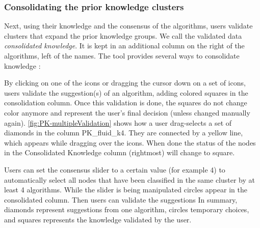 \subsubsection{Consolidating the prior knowledge clusters}
\label{sec:validating-pk}

Next, using their knowledge and the consensus of the algorithms, users validate clusters that expand the prior knowledge groups. We call the validated data \emph{consolidated knowledge}. It is kept in an additional column on the right of the algorithms, left of the names. The tool provides several ways to consolidate knowledge :


\begin{description}[leftmargin=0pt,nosep]

\item [Partial Copy.] By clicking on one of the icons or dragging the cursor down on a set of icons, users validate the suggestion(s) of an algorithm, adding colored squares in the consolidation column. Once this validation is done, the squares do not change color anymore and represent the user's final decision (unless changed manually again). \autoref{fig:PK-multipleValidation} shows how a user drag-selects a set of diamonds in the column PK\_fluid\_k4. They are connected by a yellow line, which appears while dragging over the icons.
When done the status of the nodes in the Consolidated Knowledge column (rightmost) will change to square.

\item [Consensus slider.] Users can set the consensus slider to a certain value (for example 4) to automatically select all nodes that have been classified in the same cluster by at least 4 algorithms. While the slider is being manipulated circles appear in the consolidated column.  Then users can validate the suggestions   In summary, diamonds represent suggestions from one algorithm, circles temporary choices, and squares represents the knowledge validated by the user.








\end{description}
